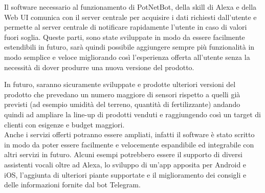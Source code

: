 Il software necessario al funzionamento di PotNetBot, della skill di Alexa e della Web UI comunica con il server centrale per acquisire i dati richiesti dall'utente e permette al server centrale di notificare rapidamente l'utente in caso di valori fuori soglia. Queste parti, sono state sviluppate in modo da essere facilmente estendibili in futuro, sarà quindi possibile aggiungere sempre più funzionalità in modo semplice e veloce migliorando così l'esperienza offerta all'utente senza la necessità di dover produrre una nuova versione del prodotto.

In futuro, saranno sicuramente sviluppate e prodotte ulteriori versioni del prodotto che prevedano un numero maggiore di sensori rispetto a quelli già previsti (ad esempio umidità del terreno, quantità di fertilizzante) andando quindi ad ampliare la line-up di prodotti venduti e raggiungendo così un target di clienti con esigenze e budget maggiori. \\Anche i servizi offerti potranno essere ampliati, infatti il software è stato scritto in modo da poter essere facilmente e velocemente espandibile ed integrabile con altri servizi in futuro. Alcuni esempi potrebbero essere il supporto di diversi assistenti vocali oltre ad Alexa, lo sviluppo di un'app apposita per Android e iOS, l'aggiunta di ulteriori piante supportate e il miglioramento dei consigli e delle informazioni fornite dal bot Telegram.